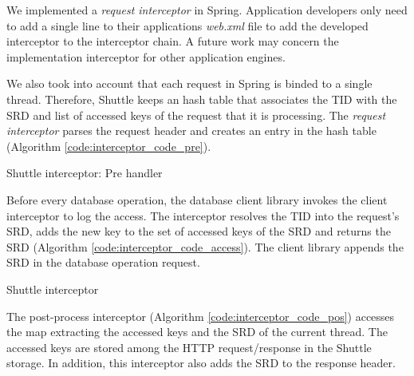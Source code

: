 We implemented a \emph{request interceptor} in Spring. Application developers only need to add a single line to their applications \emph{web.xml} file to add the developed interceptor to the interceptor chain. A future work may concern the implementation interceptor for other application engines.

We also took into account that each request in Spring is binded to a single thread. Therefore, Shuttle keeps an hash table that associates the \acf{TID} with the \acf{SRD} and list of accessed keys of the request that it is processing. The \emph{request interceptor} parses the request header and creates an entry in the hash table (Algorithm \ref{code:interceptor_code_pre}).


\begin{algorithm}
\DontPrintSemicolon{}

	\BlankLine
	\caption{Shuttle interceptor: Pre handler}
	\label{code:interceptor_code_pre}
\end{algorithm}

Before every database operation, the database client library invokes the client interceptor to log the access. The interceptor resolves the \acf{TID} into the request's \ac{SRD}, adds the new key to the set of accessed keys of the \ac{SRD} and returns the \ac{SRD} (Algorithm \ref{code:interceptor_code_access}). The client library appends the \ac{SRD} in the database operation request. 


\begin{algorithm}
\DontPrintSemicolon{}
	
\caption{Shuttle interceptor}
\label{code:interceptor_code_access}
\end{algorithm}

The post-process interceptor (Algorithm \ref{code:interceptor_code_pos}) accesses the map extracting the accessed keys and the \ac{SRD} of the current thread. The accessed keys are stored among the \ac{HTTP} request/response in the Shuttle storage. In addition, this interceptor also adds the \ac{SRD} to the response header.


